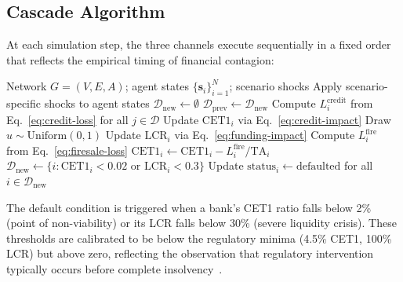 \subsection{Cascade Algorithm}

At each simulation step, the three channels execute sequentially in a fixed order that reflects the empirical timing of financial contagion:

\begin{algorithm}[H]
\caption{Three-Channel Contagion Cascade}
\label{alg:cascade}
\begin{algorithmic}[1]
\Require Network $G = (V, E, A)$; agent states $\{\mathbf{s}_i\}_{i=1}^N$; scenario shocks
\State Apply scenario-specific shocks to agent states
\State $\mathcal{D}_{\text{new}} \gets \emptyset$ 
\Repeat
    \State $\mathcal{D}_{\text{prev}} \gets \mathcal{D}_{\text{new}}$
     
        \State Compute $L_i^{\text{credit}}$ from Eq.~\eqref{eq:credit-loss} for all $j \in \mathcal{D}$
        \State Update $\text{CET1}_i$ via Eq.~\eqref{eq:credit-impact}
    \EndFor
     
            \State Draw $u \sim \mathrm{Uniform}(0,1)$
                \State Update $\text{LCR}_i$ via Eq.~\eqref{eq:funding-impact}
            \EndIf
        \EndFor
    \EndFor
     
        \State Compute $L_i^{\text{fire}}$ from Eq.~\eqref{eq:firesale-loss}
        \State $\text{CET1}_i \gets \text{CET1}_i - L_i^{\text{fire}}/\text{TA}_i$
    \EndFor
    \State $\mathcal{D}_{\text{new}} \gets \{i : \text{CET1}_i < 0.02 \text{ or } \text{LCR}_i < 0.3\}$ 
    \State Update $\text{status}_i \gets \text{defaulted}$ for all $i \in \mathcal{D}_{\text{new}}$
 
\end{algorithmic}
\end{algorithm}

The default condition is triggered when a bank's CET1 ratio falls below 2\% (point of non-viability) or its LCR falls below 30\% (severe liquidity crisis). These thresholds are calibrated to be below the regulatory minima (4.5\% CET1, 100\% LCR) but above zero, reflecting the observation that regulatory intervention typically occurs before complete insolvency~\cite{drehmann2013model}.


